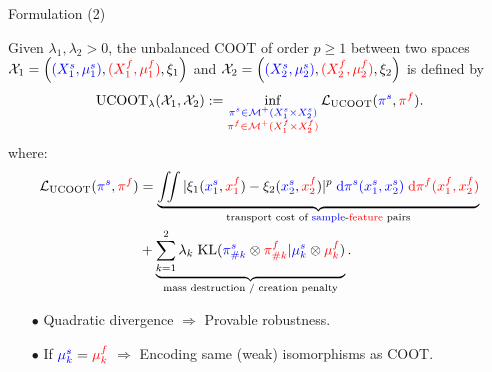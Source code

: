 \documentclass{beamer}
\newcommand{\ucoot}{\text{UCOOT}}
\newcommand{\cX}{\mathcal X}
\newcommand{\cM}{\mathcal M}
\newcommand{\cL}{\mathcal L}
\newcommand{\pis}{{\color{blue}{\pi^s}}}
\newcommand{\pif}{{\color{red}{\pi^f}}}
\newcommand{\sfspace}{{\color{blue}{s.}}{\color{red}{f. }}}
\begin{document}
\begin{frame}{Formulation (2)}
\scriptsize
\vspace{-0.8cm}
\begin{definition}[UCOOT]
  Given $\lambda_1, \lambda_2 >0$, the unbalanced COOT of order $p \geq 1$
  between two \sfspace spaces $\cX_1 = \left({\color{blue}{(X_1^s, \mu_1^s)}}, {\color{red}{(X_1^f, \mu_1^f)}}, \xi_1 \right)$
  and $\cX_2 = \left({\color{blue}{(X_2^s, \mu_2^s)}}, {\color{red}{(X_2^f, \mu_2^f)}}, \xi_2 \right)$ is defined by
  \begin{align*}
\label{eq:ucoot}
    \ucoot_{\lambda}(\cX_1, \cX_2) :=
  \inf_{\substack{{\color{blue}{\pi^s \in \cM^+(X_1^s \times X_2^s)}}
  \\ {\color{red}{\pi^f \in \cM^+(X_1^f \times X_2^f)}}}}
  \cL_{\ucoot}(\pis, \pif).
\end{align*}
\vspace{-0.8cm}
where:
\begin{align*}
    \cL_{\ucoot}(\pis, \pif) &= \underbrace{\iint
    |\xi_1({\color{blue}{x_1^s}}, {\color{red}{x_1^f}}) - \xi_2({\color{blue}{x_2^s}}, {\color{red}{x_2^f}})|^p \; {\color{blue}{\mathrm d\pi^s(x_1^s, x_2^s)}} \;
    {\color{red}{\mathrm d \pi^f(x_1^f, x_2^f)}}}_{\text{transport cost of {\color{blue}{sample}}-{\color{red}{feature}} pairs}} \\
    &+ \underbrace{\sum_{k=1}^2\lambda_k \; \text{KL}({\color{blue}{\pi^s_{\# k}}} \otimes {\color{red}{\pi^f_{\# k}}} \vert {\color{blue}{\mu^s_k}} \otimes {\color{red}{\mu^f_k}})}_{\text{mass destruction / creation penalty}}.
\end{align*}
\end{definition}

\begin{itemize}
  \item[$\bullet$] Quadratic divergence $\Rightarrow$ Provable robustness.
  \item[$\bullet$] If ${\color{blue}{\mu^s_k}} = {\color{red}{\mu^f_k}}$ $\Rightarrow$
  Encoding same (weak) isomorphisms as COOT.
\end{itemize}



\end{frame}
\end{document}
